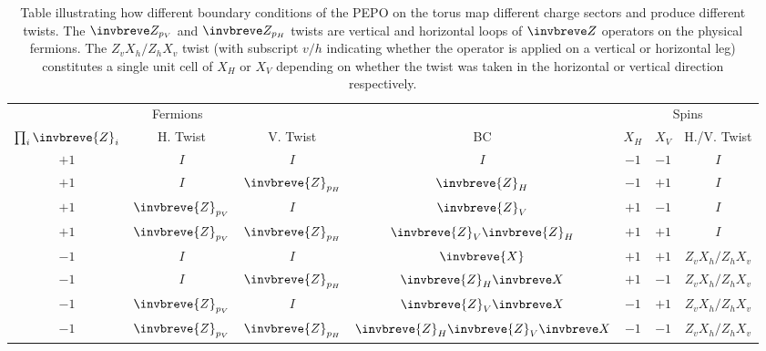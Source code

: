 \documentclass[aps,prx,twocolumn,floatfix,10pt,amssymb,amsfont,amsmath,superscriptaddress,float,nofootinbib,longbibliography,nobalancelastpage]{revtex4-2}
\begin{document}
\begin{table}
    \centering
    \begin{tabular}{|c c c| c| c c c |}
    \hline
    \multicolumn{3}{|c|}{Fermions} && \multicolumn{3}{|c|}{Spins}  \\
    $\prod_i \invbreve{Z}_i$ & H. Twist& V. Twist & BC & $X_H$ & $X_V$&H./V. Twist\\
    \hline
    $+1$ & $I$&$I$ &$I$ &$-1$ &$-1$&$I$\\
    $+1$ & $I$&$\invbreve{Z}_{p_H}$  &$\invbreve{Z}_H$ &$-1$ & $+1$&$I$\\
    $+1$ & $\invbreve{Z}_{p_V}$&$I$ &$\invbreve{Z}_V$ &$+1$ &$-1$&$I$\\
    $+1$ & $\invbreve{Z}_{p_V}$&$\invbreve{Z}_{p_H}$ &$\invbreve{Z}_V\invbreve{Z}_H$ &$+1$ &$+1$&$I$\\
    $-1$ &$I$ & $I$&$\invbreve{X}$ &$+1$ & $+1$&$Z_vX_h/Z_hX_v$\\
    $-1$ &$I$ &$\invbreve{Z}_{p_H}$ &$\invbreve{Z}_H\invbreve X$ &$+1$ &$-1$&$Z_vX_h/Z_hX_v$\\
    $-1$ & $\invbreve{Z}_{p_V}$&$I$&$\invbreve{Z}_V\invbreve X$ &$-1$ &$+1$&$Z_vX_h/Z_hX_v$\\
    $-1$ & $\invbreve{Z}_{p_V}$& $\invbreve{Z}_{p_H}$&$\invbreve{Z}_H\invbreve{Z}_V\invbreve X$ &$-1$ &$-1$&$Z_vX_h/Z_hX_v$\\
    \hline
    \end{tabular}
    \caption{Table illustrating how different boundary conditions of the PEPO on the torus map different charge sectors and produce different twists. The $\invbreve Z_{p_V}$ and $\invbreve Z_{p_H}$ twists are vertical and horizontal loops of $\invbreve Z$ operators on the physical fermions. The $Z_vX_h/Z_hX_v$ twist (with subscript $v/h$ indicating whether the operator is applied on a vertical or horizontal leg) constitutes a single unit cell of $X_H$ or $X_V$ depending on whether the twist was taken in the horizontal or vertical direction respectively.  \label{tab:torus_mapping}
}
\end{table}
\end{document}
